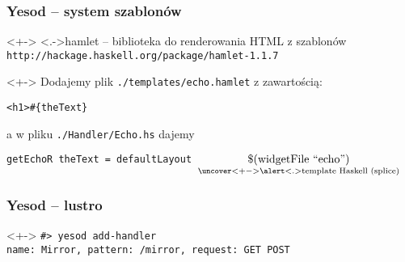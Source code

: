 \documentclass[landscape]{beamer}
\begin{document}
\begin{frame}
  \frametitle{Yesod -- system szablon\'ow}

  \begin{uncoverenv}<+->
    \alert<.->{hamlet} -- biblioteka do renderowania HTML z szablon\'ow \\
    \texttt{http://hackage.haskell.org/package/hamlet-1.1.7}
  \end{uncoverenv}

  \vspace{1em}

  \begin{uncoverenv}<+->
    Dodajemy plik \texttt{./templates/echo.hamlet} z zawarto\'sci\k{a}: \\

    \vspace{1em}

    \texttt{<h1>\#\{theText\}}

    \vspace{1em}

    a w pliku \texttt{./Handler/Echo.hs} dajemy \\
    
    \vspace{1em}

    \texttt{getEchoR theText = defaultLayout
          $\underset{\uncover<+->{\alert<.>{\text{template Haskell (splice)}}}}
                    {\text{\$(widgetFile ``echo'')}}$}
  \end{uncoverenv}
\end{frame}

\begin{frame}
  \frametitle{Yesod -- lustro}

  \begin{uncoverenv}<+->
    \texttt{\#> yesod add-handler} \\
    \texttt{name: Mirror, pattern: /mirror, request: GET POST}
  \end{uncoverenv}

  \vspace{1em}

\end{frame}
\end{document}
